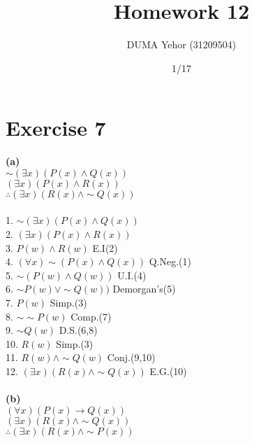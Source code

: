 \documentclass{article}
\title{Homework 12}
\author{DUMA Yehor (31209504)}
\date{1/17}
\begin{document}
\maketitle
\section{Exercise 7}
\textbf{(a)} \\
$\sim (\exists x)(P(x) \wedge  Q(x))$ \\
\underline{$(\exists x)(P(x) \wedge R(x))$} \\
$\therefore (\exists x)(R(x) \wedge \sim Q(x)) $ \\ \\
1. $\sim (\exists x)(P(x) \wedge  Q(x))$ \\
2. $(\exists x)(P(x) \wedge R(x))$ \\ 
3. $P(w) \wedge R(w)$ \hspace*{\fill} E.I(2) \\
4. $(\forall x) \sim (P(x) \wedge Q(x))$\hspace*{\fill} Q.Neg.(1) \\
5. $\sim (P(w) \wedge Q(w))$ \hspace*{\fill} U.I.(4) \\
6. $\sim P(w) \vee \sim Q(w))$\hspace*{\fill} Demorgan's(5) \\
7. $P(w)$ \hspace*{\fill} Simp.(3) \\
8. $\sim \sim P(w)$ \hspace*{\fill} Comp.(7) \\
9. $\sim Q(w)$ \hspace*{\fill} D.S.(6,8) \\
10. $R(w)$ \hspace*{\fill} Simp.(3) \\
11. $R(w) \wedge \sim Q(w)$ \hspace*{\fill} Conj.(9,10) \\
12. $(\exists x)(R(x) \wedge \sim Q(x))$ \hspace*{\fill} E.G.(10) \\\\
\textbf{(b)} \\
$(\forall x)(P(x) \rightarrow Q(x))$ \\
\underline{$(\exists x)(R(x) \wedge \sim Q(x))$} \\
$\therefore (\exists x)(R(x) \wedge \sim P(x))$ \\\\
\end{document}
